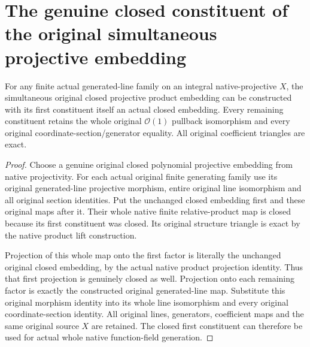 \section{The genuine closed constituent of the original simultaneous projective embedding}
\label{sec:generated-line-family-closed-projection}

\begin{theorem}
\label{thm:generated-line-family-closed-projection}
\leanok
{}
For any finite actual generated-line family on an integral
native-projective $X$, the simultaneous original closed
projective product embedding can be constructed with its
first constituent itself an actual closed embedding.
Every remaining constituent retains the whole original
$\mathcal O(1)$ pullback isomorphism and every original
coordinate-section/generator equality. All original
coefficient triangles are exact.
\end{theorem}

\begin{proof}
Choose a genuine original closed polynomial projective
embedding from native projectivity. For each actual original
finite generating family use its original generated-line
projective morphism, entire original line isomorphism and
all original section identities. Put the unchanged closed
embedding first and these original maps after it. Their
whole native finite relative-product map is closed because
its first constituent was closed. Its original structure
triangle is exact by the native product lift construction.

Projection of this whole map onto the first factor is
literally the unchanged original closed embedding, by the
actual native product projection identity. Thus that first
projection is genuinely closed as well. Projection onto
each remaining factor is exactly the constructed
original generated-line map. Substitute this original
morphism identity into its whole line isomorphism and every
original coordinate-section identity. All original lines,
generators, coefficient maps and the same original source
$X$ are retained. The closed first constituent can therefore
be used for actual whole native function-field generation.
\end{proof}
